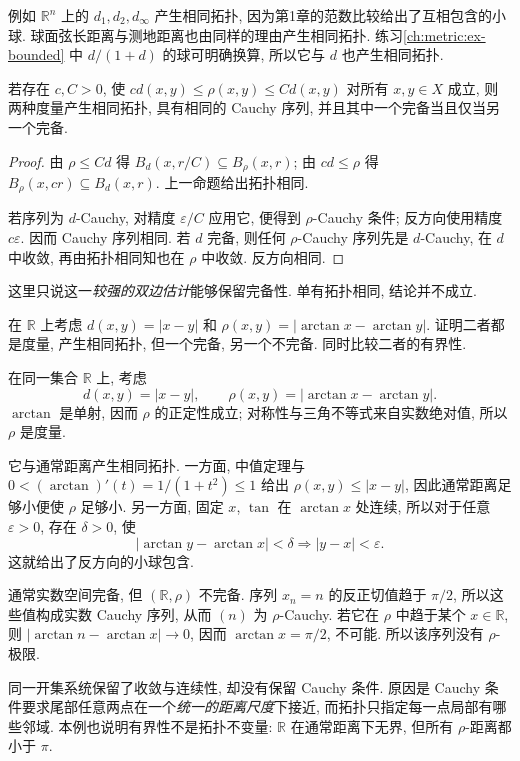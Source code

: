 例如 $\mathbb{R}^n$ 上的 $d_1,d_2,d_\infty$ 产生相同拓扑, 因为第1章的范数比较给出了互相包含的小球. 球面弦长距离与测地距离也由同样的理由产生相同拓扑. 练习\ref{ch:metric:ex-bounded} 中 $d/(1+d)$ 的球可明确换算, 所以它与 $d$ 也产生相同拓扑.

\begin{proposition}[双边常数估计的额外作用]\label{ch:seq:bilipschitz-metrics}
若存在 $c,C>0$, 使 $cd(x,y)\le\rho(x,y)\le Cd(x,y)$ 对所有 $x,y\in X$ 成立, 则两种度量产生相同拓扑, 具有相同的 Cauchy 序列, 并且其中一个完备当且仅当另一个完备.
\end{proposition}
\begin{proof}
由 $\rho\le Cd$ 得 $B_d(x,r/C)\subseteq B_\rho(x,r)$; 由 $cd\le\rho$ 得 $B_\rho(x,cr)\subseteq B_d(x,r)$. 上一命题给出拓扑相同.

若序列为 $d$-Cauchy, 对精度 $\varepsilon/C$ 应用它, 便得到 $\rho$-Cauchy 条件; 反方向使用精度 $c\varepsilon$. 因而 Cauchy 序列相同. 若 $d$ 完备, 则任何 $\rho$-Cauchy 序列先是 $d$-Cauchy, 在 $d$ 中收敛, 再由拓扑相同知也在 $\rho$ 中收敛. 反方向相同.
\end{proof}
这里只说这一\emph{较强的双边估计}能够保留完备性. 单有拓扑相同, 结论并不成立.

\begin{example}
\label{ch:seq:not-topological-complete}在 $\mathbb{R}$ 上考虑 $d(x,y)=|x-y|$ 和 $\rho(x,y)=|\arctan x-\arctan y|$. 证明二者都是度量, 产生相同拓扑, 但一个完备, 另一个不完备. 同时比较二者的有界性.
\end{example}
\begin{solution}

在同一集合 $\mathbb{R}$ 上, 考虑
\[
 d(x,y)=|x-y|,\qquad
 \rho(x,y)=|\arctan x-\arctan y|.
\]
$\arctan$ 是单射, 因而 $\rho$ 的正定性成立; 对称性与三角不等式来自实数绝对值, 所以 $\rho$ 是度量.

它与通常距离产生相同拓扑. 一方面, 中值定理与 $0<(\arctan)'(t)=1/(1+t^2)\le1$ 给出 $\rho(x,y)\le|x-y|$, 因此通常距离足够小便使 $\rho$ 足够小. 另一方面, 固定 $x$, $\tan$ 在 $\arctan x$ 处连续, 所以对于任意 $\varepsilon>0$, 存在 $\delta>0$, 使
\[
 |\arctan y-\arctan x|<\delta
 \Longrightarrow |y-x|<\varepsilon.
\]
这就给出了反方向的小球包含.

通常实数空间完备, 但 $(\mathbb{R},\rho)$ 不完备. 序列 $x_n=n$ 的反正切值趋于 $\pi/2$, 所以这些值构成实数 Cauchy 序列, 从而 $(n)$ 为 $\rho$-Cauchy. 若它在 $\rho$ 中趋于某个 $x\in\mathbb{R}$, 则 $|\arctan n-\arctan x|\to0$, 因而 $\arctan x=\pi/2$, 不可能. 所以该序列没有 $\rho$-极限.

同一开集系统保留了收敛与连续性, 却没有保留 Cauchy 条件. 原因是 Cauchy 条件要求尾部任意两点在一个\emph{统一的距离尺度}下接近, 而拓扑只指定每一点局部有哪些邻域. 本例也说明有界性不是拓扑不变量: $\mathbb{R}$ 在通常距离下无界, 但所有 $\rho$-距离都小于 $\pi$.
\end{solution}

